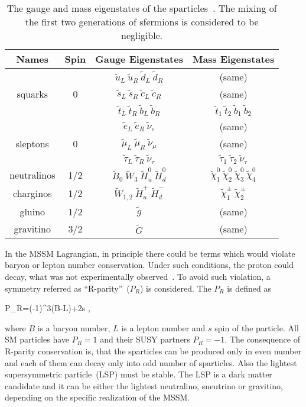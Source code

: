 \begin{table}[h]
\begin{center}
\begin{tabular}{|c|c|c|c|}
\hline
Names & Spin  & Gauge Eigenstates & Mass Eigenstates  \\
\hline
        &   & $\tilde{u}_{L}~\tilde{u}_{R}~\tilde{d}_{L}~\tilde{d}_{R}$  & (same) \\
squarks & 0 & $\tilde{s}_{L}~\tilde{s}_{R}~\tilde{c}_{L}~\tilde{c}_{R}$  & (same) \\
        &   & $\tilde{t}_{L}~\tilde{t}_{R}~\tilde{b}_{L}~\tilde{b}_{R}$  & $\tilde{t}_{1}~\tilde{t}_{2}~\tilde{b}_{1}~\tilde{b}_{2}$ \\
\hline
         &   & $\tilde{e}_{L}~\tilde{e}_{R}~\tilde{\nu}_{e}$  & (same) \\
sleptons & 0 & $\tilde{\mu}_{L}~\tilde{\mu}_{R}~\tilde{\nu}_{\mu}$  & (same) \\
         &   & $\tilde{\tau}_{L}~\tilde{\tau}_{R}~\tilde{\nu}_{\tau}$  & $\tilde{\tau}_{1}~\tilde{\tau}_{2}~\tilde{\nu}_{\tau}$ \\
\hline
neutralinos & 1/2 & $\tilde{B}_{0}~\tilde{W}_{3}~\tilde{H}_{u}^{0}~\tilde{H}_{d}^{0}$  & $\tilde{\chi}_{1}^{0}~\tilde{\chi}_{2}^{0}~\tilde{\chi}_{3}^{0}~\tilde{\chi}_{4}^{0} $ \\
\hline
charginos & 1/2 & $\tilde{W}_{1,2}~\tilde{H}_{u}^{+}~\tilde{H}_{d}^{-}$  & $\tilde{\chi}_{1}^{\pm}~\tilde{\chi}_{2}^{\pm} $ \\
\hline
gluino & 1/2 & $\tilde{g}$  & (same) \\
\hline
gravitino & 3/2 & $\tilde{G}$  & (same) \\
\hline
\end{tabular}
\caption[Table caption text]{The gauge and mass eigenstates of the sparticles~\cite{Martin:1997ns}. The mixing of the first two generations of sfermions is considered to be negligible. }
\label{tab:SUSYspectrum}
\end{center}
\end{table}

In the MSSM Lagrangian, in principle there could be terms which would violate baryon or lepton number conservation. Under such conditions, the proton could decay, what was not experimentally observed~\cite{Nishino:2009aa}. To avoid such violation, a symmetry referred as ``R-parity''~($P_{R}$) is considered. The $P_{R}$ is defined as

{
P_R=(-1)^{3(B-L)+2s },
}

where $B$ is a baryon number, $L$ is a lepton number and $s$ spin of the particle. All SM particles have $P_{R}=1$ and their SUSY partners $P_{R}=-1$. The consequence of R-parity conservation is, that the sparticles can be produced only in even number and each of them can decay only into odd number of sparticles. Also the lightest supersymmetric particle~(LSP) must be stable. The LSP is a dark matter candidate and it can be either the lightest neutralino, sneutrino or gravitino, depending on the specific realization of the MSSM. 

